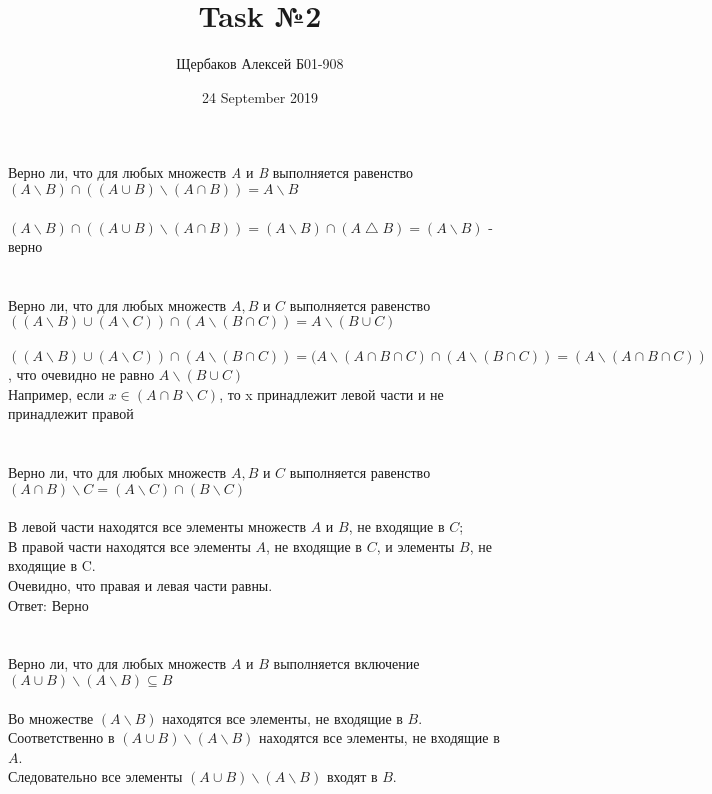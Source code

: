 \documentclass{article}
\title{Task №2}
\author{Щербаков Алексей Б01-908}
\date{24 September 2019}
\begin{document}
\maketitle
\section{}
Верно ли, что для любых множеств \textit{A} и \textit{B} выполняется равенство \\ 
$(A \backslash B) \cap ((A \cup B) \backslash (A \cap B)) = A \backslash B$
\\ \\
$(A \backslash B) \cap ((A \cup B) \backslash (A \cap B)) = (A \backslash B) \cap (A \bigtriangleup B) = (A \backslash B)$ - верно
\section{}
Верно ли, что для любых множеств $A, B$ и $C$ выполняется равенство \\ 
$((A \backslash B) \cup (A \backslash C)) \cap (A \backslash (B \cap C)) = A \backslash (B \cup C)$
\\ \\
$((A \backslash B) \cup (A \backslash C)) \cap (A \backslash (B \cap C)) = (A \backslash (A \cap B \cap C) \cap (A \backslash ( B \cap C)) = (A \backslash (A \cap B \cap C))$, что очевидно не равно $A \backslash (B \cup C)$\\ Например, если $x\in (A \cap B \backslash C)$, то x принадлежит левой части и не принадлежит правой
\section{}
Верно ли, что для любых множеств $A, B$ и $C$ выполняется равенство\\ $(A \cap B) \backslash C = (A\backslash C) \cap (B\backslash C)$
\\ \\
В левой части находятся все элементы множеств $A$ и $B$, не входящие в $C$; \\ В правой части находятся все элементы $A$, не входящие в $C$, и элементы $B$, не входящие в C. \\ Очевидно, что правая и левая части равны.
\\ Ответ: Верно
\section{}
Верно ли, что для любых множеств $A$ и $B$ выполняется включение \\ $(A \cup B) \backslash (A \backslash B) \subseteq B$
\\
\\
Во множестве $(A \backslash B)$ находятся все элементы, не входящие в $B$.\\
Соответственно в $(A \cup B) \backslash (A \backslash B)$ находятся все элементы, не входящие в $A$. \\ Следовательно все элементы $(A \cup B) \backslash (A \backslash B)$ входят в $B$.
\end{document}
